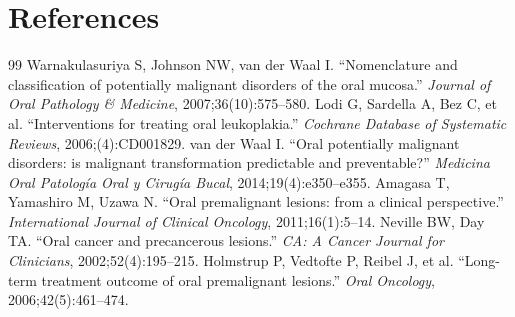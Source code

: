 \section*{References}
\begin{thebibliography}{99}
 Warnakulasuriya S, Johnson NW, van der Waal I. ``Nomenclature and classification of potentially malignant disorders of the oral mucosa.'' \textit{Journal of Oral Pathology \& Medicine}, 2007;36(10):575--580.
 Lodi G, Sardella A, Bez C, et al. ``Interventions for treating oral leukoplakia.'' \textit{Cochrane Database of Systematic Reviews}, 2006;(4):CD001829.
 van der Waal I. ``Oral potentially malignant disorders: is malignant transformation predictable and preventable?'' \textit{Medicina Oral Patolog\'ia Oral y Cirug\'ia Bucal}, 2014;19(4):e350--e355.
 Amagasa T, Yamashiro M, Uzawa N. ``Oral premalignant lesions: from a clinical perspective.'' \textit{International Journal of Clinical Oncology}, 2011;16(1):5--14.
 Neville BW, Day TA. ``Oral cancer and precancerous lesions.'' \textit{CA: A Cancer Journal for Clinicians}, 2002;52(4):195--215.
 Holmstrup P, Vedtofte P, Reibel J, et al. ``Long-term treatment outcome of oral premalignant lesions.'' \textit{Oral Oncology}, 2006;42(5):461--474.

\end{thebibliography}
